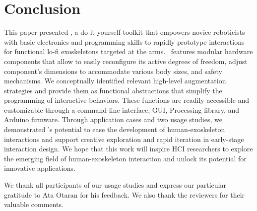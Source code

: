 \section{Conclusion}
This paper presented \toolkit, a do-it-yourself toolkit that empowers novice roboticists with basic electronics and programming skills to rapidly prototype interactions for functional lo-fi exoskeletons targeted at the arms. 
\toolkit~features modular hardware components that allow to easily reconfigure its active degrees of freedom, adjust component's dimensions to accommodate various body sizes, and safety mechanisms. We conceptually identified relevant high-level augmentation strategies and provide them as functional abstractions that simplify the programming of interactive behaviors. These functions are readily accessible and customizable through a command-line interface, GUI, Processing library, and Arduino firmware. 
Through application cases and two usage studies, we demonstrated \toolkit's potential to ease the development of human-exoskeleton interactions and support creative exploration and rapid iteration in early-stage interaction design. We hope that this work will inspire HCI researchers to explore the emerging field of human-exoskeleton interaction and unlock its potential for innovative applications.
 
\begin{acks}
    We thank all participants of our usage studies and express our particular gratitude to Ata Otaran for his feedback. We also thank the reviewers for their valuable comments.
\end{acks}
